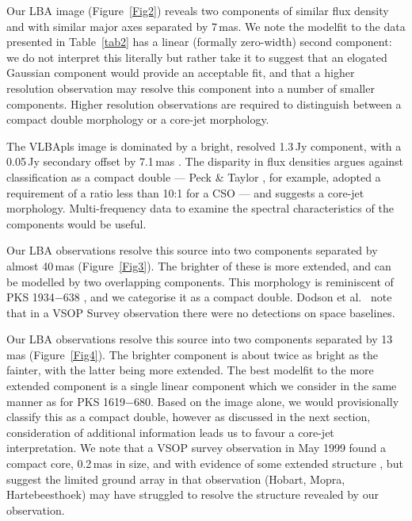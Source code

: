 \documentclass{pasa}%
\begin{document}
Our LBA image (Figure~\ref{Fig2}) reveals two components of similar
flux density and with similar major axes
separated by 7\,mas. We note the modelfit to the data
presented in Table~\ref{tab2} has
a linear (formally zero-width)
second component: we do not
interpret this literally but rather take it to suggest that an
elogated Gaussian component would provide an acceptable fit, and that
a higher resolution observation may resolve this component into a
number of smaller components.  Higher resolution observations are
required to distinguish between a compact double morphology or a
core-jet morphology.


The VLBApls image is dominated by a bright, resolved 1.3\,Jy
component, with a 0.05\,Jy secondary offset by 7.1\,mas \cite{fom00}.
The disparity in flux densities argues against classification as a
compact double --- Peck \& Taylor , for example,
adopted a requirement of a ratio less than 10:1 for a CSO --- and
suggests a core-jet morphology. Multi-frequency data to examine
the spectral characteristics of the components would be useful.


Our LBA observations resolve this source into two components separated
by almost 40\,mas (Figure~\ref{Fig3}). The brighter of these is more
extended, and can be modelled by two overlapping components.  This
morphology is reminiscent of PKS 1934$-$638 \cite{tzi02,tzi10}, and we
categorise it as a compact double.  Dodson et al.\ 
note that in a VSOP Survey observation there were no detections on
space baselines.


Our LBA observations resolve this source into two components separated
by 13\,mas (Figure~\ref{Fig4}). The brighter component is about twice
as bright as the fainter, with the latter being more extended. The
best modelfit to the more extended component is a single linear
component which we consider in the same manner as for PKS 1619$-$680.
Based on the image alone, we would provisionally classify this as a
compact double, however as discussed in the next section,
consideration of additional information leads us to favour a core-jet
interpretation.  We note that a VSOP survey observation in May 1999
found a compact core, 0.2\,mas in size, and with evidence of some
extended structure \cite{dod08}, but suggest the limited ground array
in that observation (Hobart, Mopra, Hartebeesthoek) may have struggled
to resolve the structure revealed by our observation.
\end{document}
